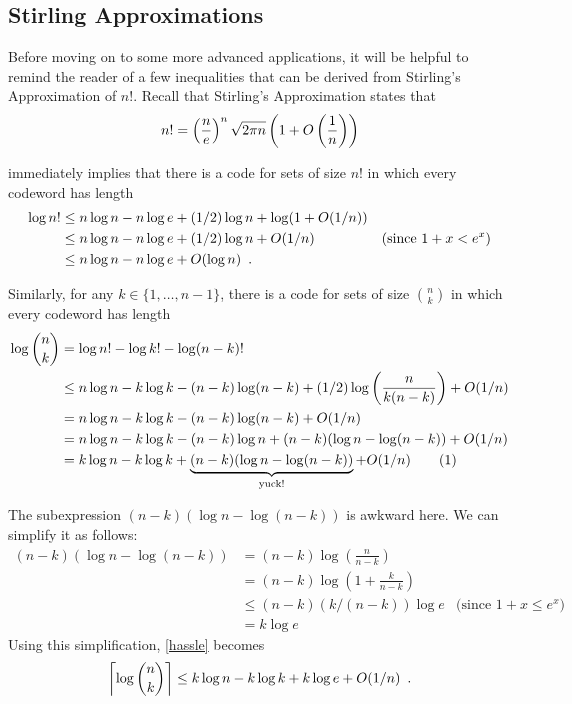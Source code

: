 \documentclass[lotsofwhite]{patmorin}
\newcommand\numberthis{\addtocounter{equation}{1}\tag{\theequation}}
\begin{document}
\subsection{Stirling Approximations}

Before moving on to some more advanced applications, it will be helpful
to remind the reader of a few inequalities that can be derived from
Stirling's Approximation of $n!$.  Recall that Stirling's Approximation
states that
\begin{equation}
  n! = \left(\frac{n}{e}\right)^n\sqrt{2\pi n}\left(1+O\left(\frac{1}{n}\right)\right) 
   \eqlabel{stirling}
\end{equation}

 immediately implies that there is a code for sets
of size $n!$ in which every codeword has length
\begin{align}
  \log n!
      & \le n\log n - n\log e + (1/2)\log n + \log(1+O(1/n)) \notag \\
      & \le n\log n - n\log e + (1/2)\log n + O(1/n)  
             & \text{(since $1+x < e^x$)}
               \eqlabel{stirling-tight} \\
      & \le n\log n - n\log e + O(\log n)  
             \eqlabel{stirling-loose} \enspace .
\end{align}

Similarly, for any $k\in\{1,\ldots,n-1\}$, there is a code for sets of 
size $\binom{n}{k}$ in which every codeword has length
\begin{align*}
  \log \binom{n}{k}
     & = \log n! - \log k! - \log (n-k)! \\
     & \le n\log n - k\log k - (n-k)\log(n-k) + (1/2)\log\left(\frac{n}{k(n-k)}\right) + O(1/n) \\
     & = n\log n - k\log k - (n-k)\log(n-k) + O(1/n) \\
     & = n\log n - k\log k - (n-k)\log n + (n-k)(\log n-\log(n-k)) + O(1/n) \\
     & = k\log n - k\log k + \underbrace{(n-k)(\log n-\log(n-k))}_\text{yuck!}  + O(1/n) 
         \numberthis \eqlabel{hassle} \\ 
\end{align*}

The subexpression $(n-k)(\log n-\log(n-k))$ is awkward here. We can
simplify it as follows:
\begin{align*}
   (n-k)(\log n-\log(n-k))
      & = (n-k)\log \left(\frac{n}{n-k}\right) \\
      & = (n-k)\log \left(1+\frac{k}{n-k}\right) \\
      & \le (n-k)(k/(n-k))\log e & \text{(since $1+x \le e^x$)} \\
      & = k\log e 
\end{align*}
Using this simplification, \eqref{hassle} becomes
\begin{equation}
  \left\lceil\log \binom{n}{k}\right\rceil 
    \le k\log n - k\log k + k\log e + O(1/n) \eqlabel{log-n-choose-k}
     \enspace .
\end{equation} 
\end{document}
